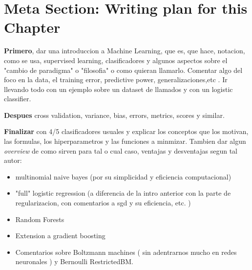 \section{Meta Section: Writing plan for this Chapter}

\textbf{Primero}, dar una introduccion a Machine Learning, que es, que hace, notacion, como se usa, supervised learning, clasificadores y algunos aspectos sobre el "cambio de paradigma" o "filosofia" o como quieran llamarlo. Comentar algo del foco en la data, el training error, predictive power, generalizaciones,etc . Ir llevando todo con un ejemplo sobre un dataset de llamados y con un logistic classifier.

\textbf{Despues} cross validation, variance, bias, errors, metrics, scores y similar.

\textbf{Finalizar} con 4/5 clasificadores usuales y explicar los conceptos que los motivan, las formulas, los hiperparametros y las funciones a minmizar. Tambien dar algun \textit{overview} de como sirven para tal o cual caso, ventajas y desventajas segun tal autor: 
\begin{itemize}
	\item multinomial naive bayes (por su simplicidad y eficiencia computacional)
	\item "full" logistic regression (a diferencia de la intro anterior con la parte de regularizacion, con comentarios a sgd y su eficiencia, etc. )
	\item Random Forests
	\item Extension a gradient boosting
	\item Comentarios sobre Boltzmann machines ( sin adentrarnos mucho en redes neuronales ) y Bernoulli RestrictedBM.
\end{itemize}

